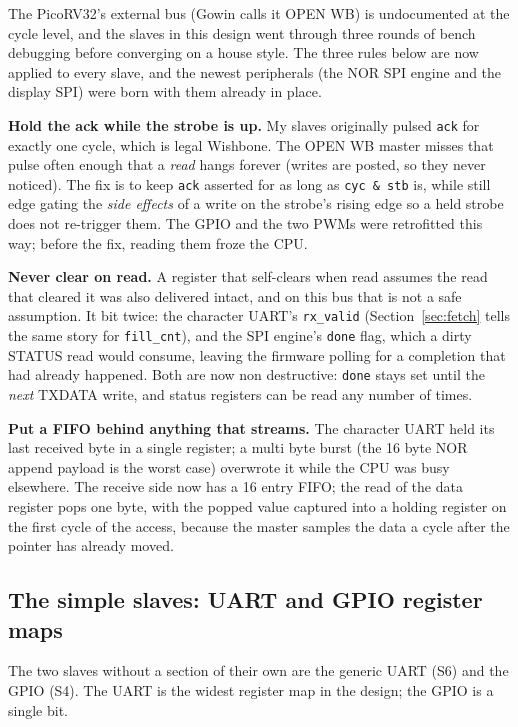 \documentclass[a4paper,11pt]{article}
\begin{document}
The PicoRV32's external bus (Gowin calls it OPEN WB) is undocumented at the
cycle level, and the slaves in this design went through three rounds of bench
debugging before converging on a house style. The three rules below are now
applied to every slave, and the newest peripherals (the NOR SPI engine and the
display SPI) were born with them already in place.

\textbf{Hold the ack while the strobe is up.} My slaves originally pulsed
\texttt{ack} for exactly one cycle, which is legal Wishbone. The OPEN WB master
misses that pulse often enough that a \emph{read} hangs forever (writes are
posted, so they never noticed). The fix is to keep \texttt{ack} asserted for as
long as \texttt{cyc \& stb} is, while still edge gating the \emph{side effects}
of a write on the strobe's rising edge so a held strobe does not re-trigger
them. The GPIO and the two PWMs were retrofitted this way; before the fix,
reading them froze the CPU.

\textbf{Never clear on read.} A register that self-clears when read assumes the
read that cleared it was also delivered intact, and on this bus that is not a
safe assumption. It bit twice: the character UART's \texttt{rx\_valid}
(Section~\ref{sec:fetch} tells the same story for \texttt{fill\_cnt}), and the
SPI engine's \texttt{done} flag, which a dirty STATUS read would consume,
leaving the firmware polling for a completion that had already happened. Both
are now non destructive: \texttt{done} stays set until the \emph{next} TXDATA
write, and status registers can be read any number of times.

\textbf{Put a FIFO behind anything that streams.} The character UART held its
last received byte in a single register; a multi byte burst (the 16 byte NOR
append payload is the worst case) overwrote it while the CPU was busy
elsewhere. The receive side now has a 16 entry FIFO; the read of the data
register pops one byte, with the popped value captured into a holding register
on the first cycle of the access, because the master samples the data a cycle
after the pointer has already moved.

\subsection{The simple slaves: UART and GPIO register maps}

The two slaves without a section of their own are the generic UART (S6) and the GPIO
(S4). The UART is the widest register map in the design; the GPIO is a single bit.
\end{document}
